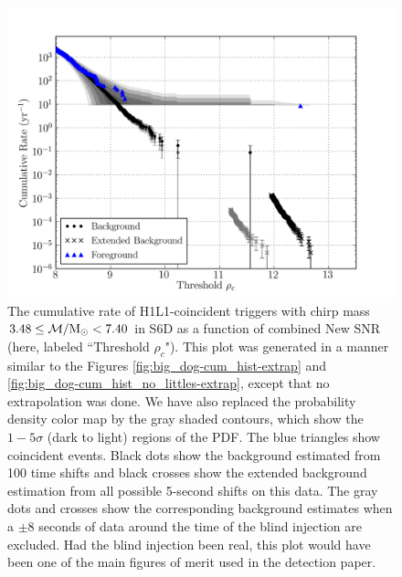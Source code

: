 \begin{figure}[p]
\center
\includegraphics[width=6in]{figures/big_dog/H1L1V1-lalapps_cbc_plotrates_FINAL_PLOT_cumulative_F1_ALL_DATA_PLOTTED_OPEN_BOX-961545543-10076544.png}
\caption{The cumulative rate of H1L1-coincident triggers with chirp mass $3.48 \le \mathcal{M}/\mathrm{M_\odot}
< 7.40$ in S6D as a function of combined New SNR (here, labeled
``Threshold $\rho_c$"). This plot was generated in a manner similar to the
Figures \ref{fig:big_dog-cum_hist-extrap} and
\ref{fig:big_dog-cum_hist_no_littles-extrap}, except that no extrapolation was
done. We have also replaced the probability density color map by the gray
shaded contours, which show the $1 - 5\sigma$ (dark to light) regions of the
PDF. The blue triangles show coincident events.  Black dots show the
background estimated from 100 time shifts and black crosses show the extended
background estimation from all possible 5-second shifts on this data.  The gray
dots and crosses show the corresponding background estimates when a $\pm 8$
seconds of data around the time of the blind injection are excluded. Had the
blind injection been real, this plot would have been one of the main figures of
merit used in the detection paper.}
\label{fig:big_dog-rate_plot}
\end{figure}
